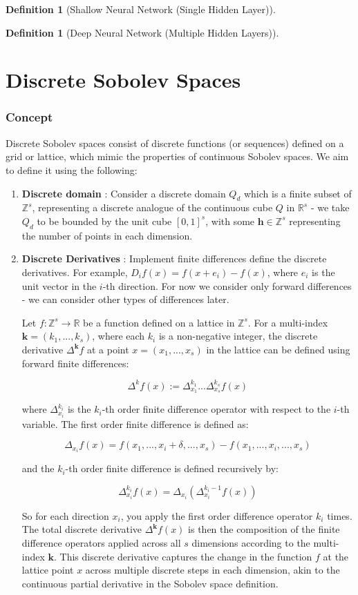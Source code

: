 \documentclass[11pt,a4paper]{article}
\theoremstyle{plain}
\theoremstyle{definition}
\newtheorem{definition}[theorem]{Definition}
\theoremstyle{remark}
\begin{document}
\begin{definition}[Shallow Neural Network (Single Hidden Layer)]
\begin{definition}[Deep Neural Network (Multiple Hidden Layers)]
\section{Discrete Sobolev Spaces}
\subsubsection*{Concept}
Discrete Sobolev spaces consist of discrete functions (or sequences) defined on a grid or lattice, which mimic the properties of continuous Sobolev spaces. We aim to define it using the following:

\begin{enumerate}
    \item \textbf{Discrete domain} : Consider a discrete domain \( Q_d \) which is a finite subset of \( \mathbb{Z}^s \), representing a discrete analogue of the continuous cube \( Q \) in \( \mathbb{R}^s \) - we take \(Q_{d}\) to be bounded by the unit cube \( [0,1]^s \), with some \( \mathbf{h} \in \mathbb{Z}^{s}  \) representing the number of points in each dimension.
    \item \textbf{Discrete Derivatives} : Implement finite differences define the discrete derivatives. For example, \( D_i f(x) = f(x + e_i) - f(x) \), where \( e_i \) is the unit vector in the \( i \)-th direction. For now we consider only forward differences - we can consider other types of differences later.

    Let \( f: \mathbb{Z}^s \rightarrow \mathbb{R} \) be a function defined on a lattice in \( \mathbb{Z}^s \). For a multi-index \( \mathbf{k} = (k_1, ..., k_s) \), where each \( k_i \) is a non-negative integer, the discrete derivative \( \Delta^{\mathbf{k}} f \) at a point \( x = (x_1, ..., x_s) \) in the lattice can be defined using forward finite differences:

    \[ \Delta^k f(x) := \Delta^{k_1}_{x_1} ... \Delta^{k_s}_{x_s} f(x) \]

    where \( \Delta^{k_i}_{x_i} \) is the \( k_i \)-th order finite difference operator with respect to the \( i \)-th variable. The first order finite difference is defined as:

    \[ \Delta_{x_i} f(x) = f(x_1, ..., x_i + \delta, ..., x_s) - f(x_1, ..., x_i, ..., x_s) \]

    and the \( k_i \)-th order finite difference is defined recursively by:

    \[ \Delta^{k_i}_{x_i} f(x) = \Delta_{x_i} (\Delta^{k_i-1}_{x_i} f(x)) \]

    So for each direction \( x_i \), you apply the first order difference operator \( k_i \) times. The total discrete derivative \( \Delta^{\mathbf{k}}  f(x) \) is then the composition of the finite difference operators applied across all \( s \) dimensions according to the multi-index \( \mathbf{k} \). This discrete derivative captures the change in the function \( f \) at the lattice point \( x \) across multiple discrete steps in each dimension, akin to the continuous partial derivative in the Sobolev space definition.


\end{enumerate}
\end{definition}
\end{definition}
\end{document}
